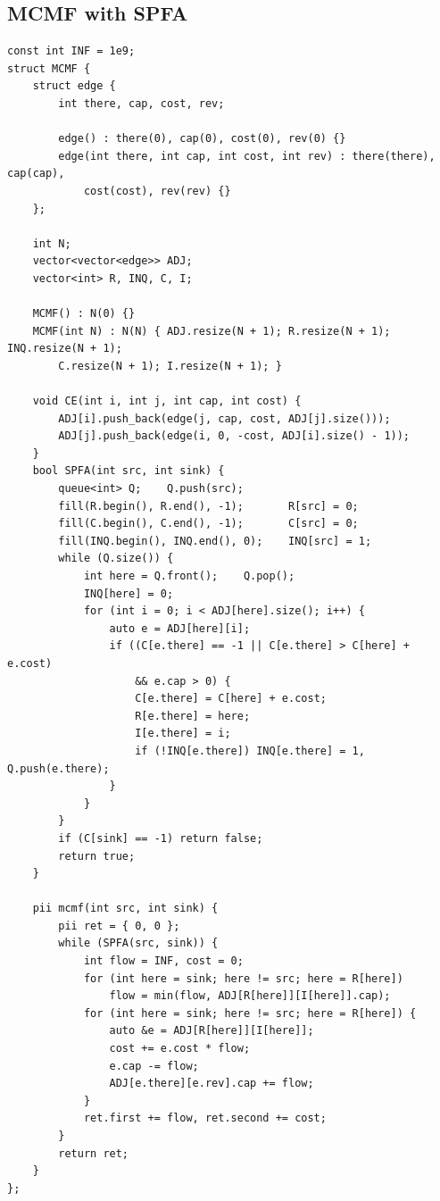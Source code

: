 \documentclass[landscape, 8pt, a4paper, oneside, twocolumn]{extarticle}
\begin{document}
\subsection{MCMF with SPFA}
\begin{verbatim}
const int INF = 1e9;
struct MCMF {
    struct edge {
        int there, cap, cost, rev;

        edge() : there(0), cap(0), cost(0), rev(0) {}
        edge(int there, int cap, int cost, int rev) : there(there), cap(cap), 
            cost(cost), rev(rev) {}
    };

    int N;
    vector<vector<edge>> ADJ;
    vector<int> R, INQ, C, I;

    MCMF() : N(0) {}
    MCMF(int N) : N(N) { ADJ.resize(N + 1); R.resize(N + 1); INQ.resize(N + 1);
        C.resize(N + 1); I.resize(N + 1); }

    void CE(int i, int j, int cap, int cost) {
        ADJ[i].push_back(edge(j, cap, cost, ADJ[j].size()));
        ADJ[j].push_back(edge(i, 0, -cost, ADJ[i].size() - 1));
    }
    bool SPFA(int src, int sink) {
        queue<int> Q;    Q.push(src);
        fill(R.begin(), R.end(), -1);       R[src] = 0;
        fill(C.begin(), C.end(), -1);       C[src] = 0;
        fill(INQ.begin(), INQ.end(), 0);    INQ[src] = 1;
        while (Q.size()) {
            int here = Q.front();    Q.pop();
            INQ[here] = 0;
            for (int i = 0; i < ADJ[here].size(); i++) {
                auto e = ADJ[here][i];
                if ((C[e.there] == -1 || C[e.there] > C[here] + e.cost)
                    && e.cap > 0) {
                    C[e.there] = C[here] + e.cost;
                    R[e.there] = here;
                    I[e.there] = i;
                    if (!INQ[e.there]) INQ[e.there] = 1, Q.push(e.there);
                }
            }
        }
        if (C[sink] == -1) return false;
        return true;
    }

    pii mcmf(int src, int sink) {
        pii ret = { 0, 0 };
        while (SPFA(src, sink)) {
            int flow = INF, cost = 0;
            for (int here = sink; here != src; here = R[here])
                flow = min(flow, ADJ[R[here]][I[here]].cap);
            for (int here = sink; here != src; here = R[here]) {
                auto &e = ADJ[R[here]][I[here]];
                cost += e.cost * flow;
                e.cap -= flow;
                ADJ[e.there][e.rev].cap += flow;
            }
            ret.first += flow, ret.second += cost;
        }
        return ret;
    }
};
\end{verbatim}
\end{document}
